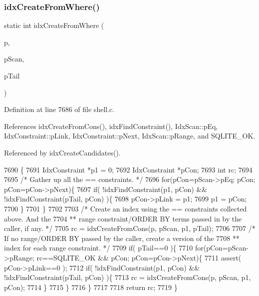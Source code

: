 \subsubsection{idx\+Create\+From\+Where()}
{\footnotesize\ttfamily static int idx\+Create\+From\+Where (\begin{DoxyParamCaption}\item[{\textbf{ sqlite3expert} $\ast$}]{p,  }\item[{\textbf{ Idx\+Scan} $\ast$}]{p\+Scan,  }\item[{\textbf{ Idx\+Constraint} $\ast$}]{p\+Tail }\end{DoxyParamCaption})\hspace{0.3cm}{\ttfamily [static]}}



Definition at line 7686 of file shell.\+c.



References idx\+Create\+From\+Cons(), idx\+Find\+Constraint(), Idx\+Scan\+::p\+Eq, Idx\+Constraint\+::p\+Link, Idx\+Constraint\+::p\+Next, Idx\+Scan\+::p\+Range, and S\+Q\+L\+I\+T\+E\+\_\+\+OK.



Referenced by idx\+Create\+Candidates().


\begin{DoxyCode}
7690  \{
7691   IdxConstraint *p1 = 0;
7692   IdxConstraint *pCon;
7693   \textcolor{keywordtype}{int} rc;
7694 
7695   \textcolor{comment}{/* Gather up all the == constraints. */}
7696   \textcolor{keywordflow}{for}(pCon=pScan->pEq; pCon; pCon=pCon->pNext)\{
7697     \textcolor{keywordflow}{if}( !idxFindConstraint(p1, pCon) && !idxFindConstraint(pTail, pCon) )\{
7698       pCon->pLink = p1;
7699       p1 = pCon;
7700     \}
7701   \}
7702 
7703   \textcolor{comment}{/* Create an index using the == constraints collected above. And the}
7704 \textcolor{comment}{  ** range constraint/ORDER BY terms passed in by the caller, if any. */}
7705   rc = idxCreateFromCons(p, pScan, p1, pTail);
7706 
7707   \textcolor{comment}{/* If no range/ORDER BY passed by the caller, create a version of the}
7708 \textcolor{comment}{  ** index for each range constraint.  */}
7709   \textcolor{keywordflow}{if}( pTail==0 )\{
7710     \textcolor{keywordflow}{for}(pCon=pScan->pRange; rc==SQLITE_OK && pCon; pCon=pCon->pNext)\{
7711       assert( pCon->pLink==0 );
7712       \textcolor{keywordflow}{if}( !idxFindConstraint(p1, pCon) && !idxFindConstraint(pTail, pCon) )\{
7713         rc = idxCreateFromCons(p, pScan, p1, pCon);
7714       \}
7715     \}
7716   \}
7717 
7718   \textcolor{keywordflow}{return} rc;
7719 \}
\end{DoxyCode}
\mbox{\label{shell_8c_ab0c63e1071b37a4f971679c766a5d479}} 
